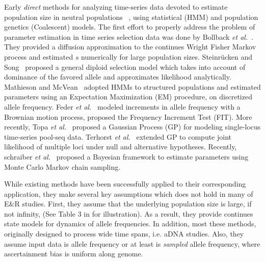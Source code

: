 Early \emph{direct} methods for analyzing time-series data
devoted to estimate population size in neutral populations 
~\cite{williamson1999using,anderson2000monte,beaumont2003estimation,berthier2002likelihood,wang2001pseudo},
 using statistical (HMM) and population genetics (Coalescent) models. 
The first effort to properly address the problem of parameter estimation in time 
series 
selection data was done by Bollback \emph{et 
	al.}~\cite{bollback2008estimation}.
 They provided a diffusion approximation 
	to
the continues Wright Fisher Markov process and estimated $s$
numerically for large population sizes.
Steinr\"{u}cken and Song~\cite{steinrucken2014novel} proposed a general 
diploid selection model which 
takes into account of dominance of the favored allele and approximates 
likelihood analytically.
Mathieson and McVean~\cite{mathieson2013estimating} adopted HMMs to 
structured populations and estimated parameters using an Expectation 
Maximization (EM) procedure, on discretized allele frequency.
Feder \emph{et al.}~\cite{feder2014Identifying}
modeled increments in allele frequency with a Brownian motion process,  
proposed the Frequency
Increment Test (FIT). More recently, Topa \emph{et
  al.}~\cite{topa2015gaussian} proposed a Gaussian Process (GP) for
modeling single-locus time-series pool-seq data. Terhorst \emph{et
  al.}~\cite{Terhorst2015Multi} extended GP to compute joint
likelihood of multiple loci under null and alternative hypotheses.
Recently, schraiber \emph{et al.}~\cite{schraiber2016bayesian} proposed a 
Bayesian framework to estimate 
parameters using Monte Carlo Markov chain sampling.


While existing methods have been successfully applied to their corresponding 
application, they make several key assumptions which does not hold in many 
of E\&R studies.
First, they assume that the underlying population size is large, if not infinity,
(See Table 3 in \cite{malaspinas2016methods} for illustration). As a result,  
they provide continues state models for dynamics of allele frequencies.
In addition, most these methods, originally designed to process wide time 
spans, i.e. aDNA studies. Also, they assume input data is allele 
frequency or at least is \emph{sampled} allele frequency, where ascertainment 
bias is uniform along genome.

